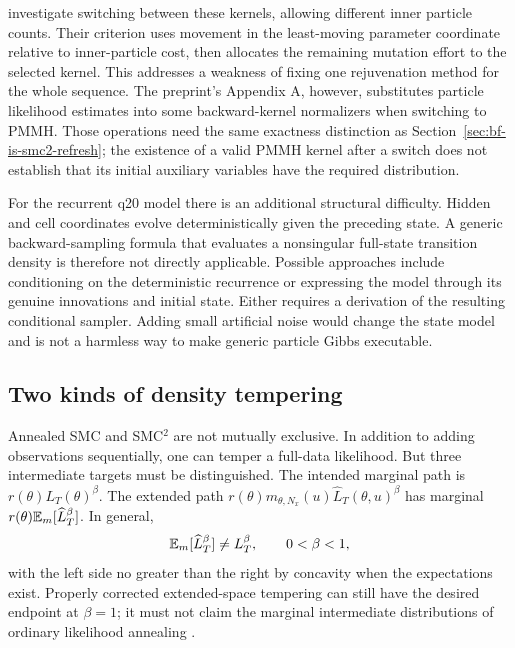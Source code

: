 \citet[Sections 3--4]{botha2023switchingsmc2} investigate switching between
these kernels, allowing different inner particle counts. Their criterion
uses movement in the least-moving parameter coordinate relative to
inner-particle cost, then allocates the remaining mutation effort to the
selected kernel. This addresses a weakness of fixing one rejuvenation
method for the whole sequence. The preprint's Appendix A, however,
substitutes particle likelihood estimates into some backward-kernel
normalizers when switching to PMMH. Those operations need the same
exactness distinction as Section~\ref{sec:bf-is-smc2-refresh}; the existence
of a valid PMMH kernel after a switch does not establish that its initial
auxiliary variables have the required distribution.

For the recurrent q20 model there is an additional structural difficulty.
Hidden and cell coordinates evolve deterministically given the preceding
state. A generic backward-sampling formula that evaluates a nonsingular
full-state transition density is therefore not directly applicable.
Possible approaches include conditioning on the deterministic recurrence
or expressing the model through its genuine innovations and initial state.
Either requires a derivation of the resulting conditional sampler. Adding
small artificial noise would change the state model and is not a harmless
way to make generic particle Gibbs executable.

\subsection{Two kinds of density tempering}

Annealed SMC and SMC$^2$ are not mutually exclusive. In addition to adding
observations sequentially, one can temper a full-data likelihood. But three
intermediate targets must be distinguished. The intended marginal path is
$r(\theta)L_T(\theta)^\beta$. The extended path
$r(\theta)m_{\theta,N_x}(u)\widehat L_T(\theta,u)^\beta$ has marginal
$r(\theta)\mathbb{E}_m[\widehat L_T^\beta]$. In general,
\begin{equation}
 \mathbb{E}_m[\widehat L_T^\beta]\ne L_T^\beta,
 \qquad 0<\beta<1,
 \label{eq:bf-is-smc2-power-inequality}
\end{equation}
with the left side no greater than the right by concavity when the
expectations exist. Properly corrected extended-space tempering can still
have the desired endpoint at $\beta=1$; it must not claim the marginal
intermediate distributions of ordinary likelihood annealing
\citep[Section 5.2]{chopin2013smc2}.

